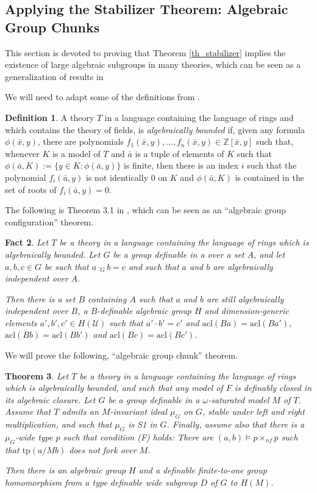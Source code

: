 \documentclass[12pt]{article}
\newtheorem{thm}{Theorem}[section]
\newtheorem{fait}[thm]{Fact}
\theoremstyle{definition}
\newtheorem{defi}[thm]{Definition}
\theoremstyle{mystyle}
\theoremstyle{remark}
\newcommand{\acl}{\mathrm{acl}}
\newcommand{\tp}{\mathrm{tp}}
\newcommand{\nf}{\times_{nf}}
\begin{document}
\subsection{Applying the Stabilizer Theorem: Algebraic Group Chunks}

This section is devoted to proving that Theorem
\ref{th_stabilizer} implies the existence of large algebraic
subgroups in many theories, which can be seen as a generalization
of results in \cite{HrPi}

We will need to adapt some of the definitions from \cite{HrPi}.


\begin{defi}
A theory $T$ in a language containing the language of rings and
which contains the theory of fields, is \emph{algebraically
bounded} if, given any formula $\phi(\bar{x},y)$, there are
polynomials $f_1(\bar{x}, y),\ldots, f_n(\bar{x},y) \in
\mathbb{Z}[\bar{x},y]$ such that, whenever $K$ is a model of $T$
and $\bar{a}$ is a tuple of elements of $K$ such that
$\phi(\bar{a},K):= \{y \in K: \phi(\bar{a},y)\}$ is finite, then
there is an index $i$ such that the polynomial $f_i(\bar{a},y)$ is
not identically $0$ on $K$ and $\phi(\bar{a},K)$ is contained in
the set of roots of $f_{i}(\bar{a},y)= 0$.
\end{defi}

The following is Theorem 3.1 in \cite{HrPi}, which can be seen as
an ``algebraic group configuration'' theorem.


\begin{fait}
Let $T$ be a theory in a language containing the language of rings
which is algebraically bounded. Let $G$ be a group definable in a
over a set $A$, and let $a,b,c\in G$ be such that $a\cdot_G b=c$ and such that
$a$ and $b$ are algebraically independent over $A$.

Then there is a set $B$ containing $A$ such that $a$ and $b$ are still algebraically independent
over $B$, a $B$-definable algebraic group
$H$ and dimension-generic elements $a', b', c'\in H(\mathcal{U})$
such that $a'\cdot b' = c'$ and $\acl(Ba)=\acl(Ba')$,
$\acl(Bb)=\acl(Bb')$ and $\acl(Bc)=\acl(Bc')$.
\end{fait}


We will prove the following, ``algebraic group chunk'' theorem.

\begin{thm}\label{algebraic group chunk}
Let $T$ be a theory in a language containing the language of rings
which is algebraically bounded, and such that any model of $F$ is
definably closed in its algebraic closure. Let $G$ be a group
definable in a $\omega$-saturated model $M$ of $T$. Assume that
$T$ admits an $M$-invariant ideal $\mu_G$ on $G$, stable under
left and right multiplication, and such that $\mu_G$ is S1 in $G$.
Finally, assume also that there is a $\mu_G$-wide type $p$ such
that condition (F) holds: There are $(a,b)\models p \nf p$ such
that $\tp(a/Mb)$ does not fork over $M$.

Then there is an algebraic group $H$ and a definable finite-to-one
group homomorphism from a type definable wide subgroup $D$ of $G$
to $H(M)$.
\end{thm}
\end{document}
